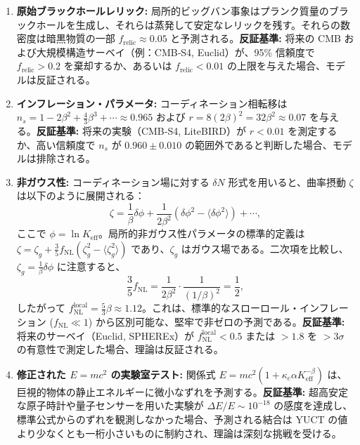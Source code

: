 \documentclass[11pt,a4paper]{article}
\newcommand{\Keff}{K_{\mathrm{eff}}}
\begin{document}
	\begin{enumerate}
		\item \textbf{原始ブラックホールレリック:} 局所的ビッグバン事象はプランク質量のブラックホールを生成し、それらは蒸発して安定なレリックを残す。それらの数密度は暗黒物質の一部 \(f_{\mathrm{relic}} \approx 0.05\) と予測される。\textbf{反証基準:} 将来の CMB および大規模構造サーベイ（例：CMB‑S4, Euclid）が、95\% 信頼度で \(f_{\mathrm{relic}} > 0.2\) を棄却するか、あるいは \(f_{\mathrm{relic}} < 0.01\) の上限を与えた場合、モデルは反証される。
		\item \textbf{インフレーション・パラメータ:} コーディネーション相転移は \(n_s = 1 - 2\beta^2 + \frac{4}{3}\beta^3 + \cdots \approx 0.965\) および \(r = 8(2\beta)^2 = 32\beta^2 \approx 0.07\) を与える。\textbf{反証基準:} 将来の実験（CMB‑S4, LiteBIRD）が \(r < 0.01\) を測定するか、高い信頼度で \(n_s\) が \(0.960 \pm 0.010\) の範囲外であると判断した場合、モデルは排除される。
		\item \textbf{非ガウス性:} コーディネーション場に対する \(\delta N\) 形式を用いると、曲率摂動 \(\zeta\) は以下のように展開される：
		\[
		\zeta = \frac{1}{\beta} \delta\phi + \frac{1}{2\beta^2} (\delta\phi^2 - \langle\delta\phi^2\rangle) + \cdots,
		\]
		ここで \(\phi = \ln \Keff\)。局所的非ガウス性パラメータの標準的定義は \(\zeta = \zeta_g + \frac{3}{5} f_{\mathrm{NL}} (\zeta_g^2 - \langle\zeta_g^2\rangle)\) であり、\(\zeta_g\) はガウス場である。二次項を比較し、\(\zeta_g = \frac{1}{\beta}\delta\phi\) に注意すると、
		\[
		\frac{3}{5} f_{\mathrm{NL}} = \frac{1}{2\beta^2} \cdot \frac{1}{(1/\beta)^2} = \frac{1}{2},
		\]
		したがって \(f_{\mathrm{NL}}^{\mathrm{local}} = \frac{5}{3}\beta \approx 1.12\)。これは、標準的なスローロール・インフレーション (\(f_{\mathrm{NL}} \ll 1\)) から区別可能な、堅牢で非ゼロの予測である。\textbf{反証基準:} 将来のサーベイ（Euclid, SPHEREx）が \(f_{\mathrm{NL}}^{\mathrm{local}} < 0.5\) または \(> 1.8\) を \(>3\sigma\) の有意性で測定した場合、理論は反証される。
		\item \textbf{修正された \(E=mc^2\) の実験室テスト:} 関係式 \(E = m c^2 (1 + \kappa_c \alpha K_{\mathrm{eff}}^{-\beta})\) は、巨視的物体の静止エネルギーに微小なずれを予測する。\textbf{反証基準:} 超高安定な原子時計や量子センサーを用いた実験が \(\Delta E / E \sim 10^{-18}\) の感度を達成し、標準公式からのずれを観測しなかった場合、予測される結合は YUCT の値より少なくとも一桁小さいものに制約され、理論は深刻な挑戦を受ける。
	\end{enumerate}
	
\end{document}
